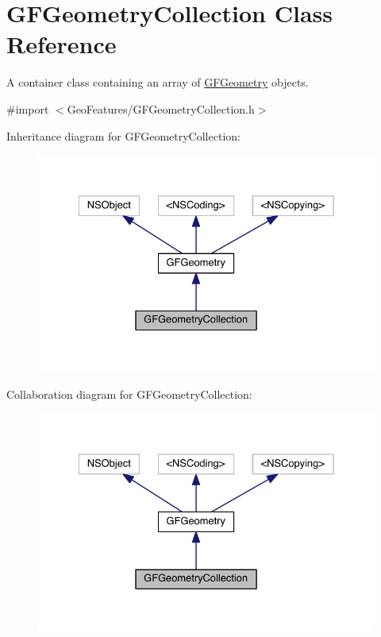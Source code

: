 \hypertarget{interface_g_f_geometry_collection}{}\section{G\+F\+Geometry\+Collection Class Reference}
\label{interface_g_f_geometry_collection}


A container class containing an array of \hyperlink{interface_g_f_geometry}{G\+F\+Geometry} objects.  




{\ttfamily \#import $<$Geo\+Features/\+G\+F\+Geometry\+Collection.\+h$>$}



Inheritance diagram for G\+F\+Geometry\+Collection\+:\nopagebreak
\begin{figure}[H]
\begin{center}
\leavevmode
\includegraphics[width=329pt]{interface_g_f_geometry_collection__inherit__graph}
\end{center}
\end{figure}


Collaboration diagram for G\+F\+Geometry\+Collection\+:\nopagebreak
\begin{figure}[H]
\begin{center}
\leavevmode
\includegraphics[width=329pt]{interface_g_f_geometry_collection__coll__graph}
\end{center}
\end{figure}
